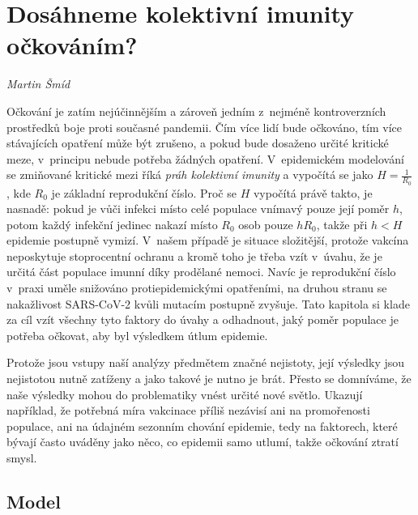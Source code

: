 
\chapter{Dosáhneme kolektivní imunity o\v{c}kováním?} \label{Nekolik_poznamek}

\textit{Martin Šmíd}
\vspace{15mm}

Očkování je zatím nejúčinnějším a zároveň jedním z~nejméně kontroverzních
prostředků boje proti současné pandemii. Čím více lidí bude očkováno,
tím více stávajících opatření může být zrušeno, a pokud bude dosaženo určité kritické
meze, v~principu nebude potřeba žádných opatření. V~epidemickém modelování se zmiňované kritické mezi říká {\em práh kolektivní imunity} a vypočítá se jako $H=\frac{1}{R_0}$, kde $R_0$ je základní reprodukční číslo. Proč se $H$ vypočítá právě takto, je nasnadě: pokud je vůči infekci místo celé populace vnímavý pouze její poměr $h$, potom každý infekční jedinec nakazí místo $R_0$ osob pouze $h R_0$, takže při $h < H$ epidemie postupně vymizí. V~našem případě je situace složitější, protože vakcína neposkytuje stoprocentní ochranu a kromě toho je třeba vzít v~úvahu, že je určitá část populace imunní díky prodělané nemoci. Navíc je reprodukční číslo v~praxi uměle snižováno protiepidemickými opatřeními, na druhou stranu se nakažlivost SARS-CoV-2 kvůli mutacím postupně zvyšuje. Tato kapitola si klade za cíl vzít všechny tyto faktory do úvahy a odhadnout, jaký poměr populace je potřeba očkovat, aby byl výsledkem útlum epidemie.

Protože jsou vstupy naší analýzy předmětem značné nejistoty, její výsledky jsou nejistotou nutně zatíženy a jako takové je nutno je brát. Přesto se domníváme, že naše výsledky mohou do problematiky vnést určité nové světlo. Ukazují například, že potřebná míra vakcinace příliš nezávisí
ani na promořenosti populace, ani na údajném sezonním chování epidemie,
tedy na faktorech, které bývají často uváděny jako něco, co epidemii samo utlumí, takže očkování ztratí smysl.

\section*{Model}

